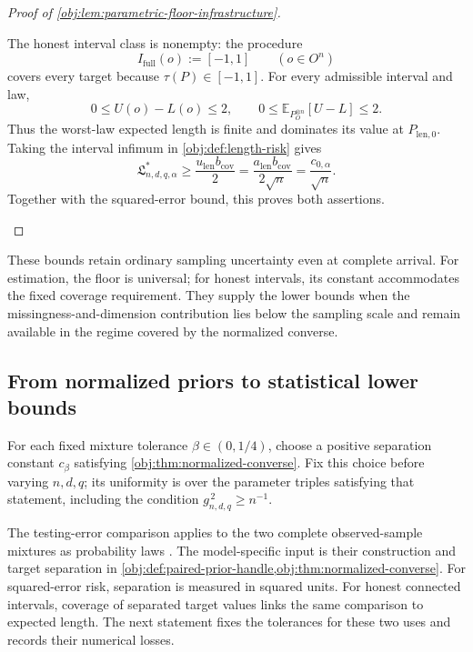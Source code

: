 \documentclass[11pt]{article}
\begin{document}
\begin{proof}[Proof of \cref{obj:lem:parametric-floor-infrastructure}]
\begin{enumerate}
The honest interval class is nonempty: the procedure
\[
I_{\mathrm{full}}(o):=[-1,1]
\qquad(o\in O^n)
\]
covers every target because \(\tau(P)\in[-1,1]\). For every admissible interval and law,
\[
0\le U(o)-L(o)\le2,
\qquad
0\le\mathbb E_{P_O^{\otimes n}}[U-L]\le2.
\]
Thus the worst-law expected length is finite and dominates its value at \(P_{\mathrm{len},0}\). Taking the interval infimum in \cref{obj:def:length-risk} gives
\[
\mathfrak L^*_{n,d,q,\alpha}
\ge
\frac{u_{\mathrm{len}}b_{\mathrm{cov}}}{2}
=
\frac{a_{\mathrm{len}}b_{\mathrm{cov}}}{2\sqrt n}
=
\frac{c_{0,\alpha}}{\sqrt n}.
\]
Together with the squared-error bound, this proves both assertions.
\end{enumerate}
\end{proof}

These bounds retain ordinary sampling uncertainty even at complete arrival. For estimation, the floor is universal; for honest intervals, its constant accommodates the fixed coverage requirement. They supply the lower bounds when the missingness-and-dimension contribution lies below the sampling scale and remain available in the regime covered by the normalized converse.

\subsection{From normalized priors to statistical lower bounds}

For each fixed mixture tolerance \(\beta\in(0,1/4)\), choose a positive separation constant \(c_\beta\) satisfying \cref{obj:thm:normalized-converse}. Fix this choice before varying \(n,d,q\); its uniformity is over the parameter triples satisfying that statement, including the condition \(g_{n,d,q}^{\,2}\ge n^{-1}\).

The testing-error comparison applies to the two complete observed-sample mixtures as probability laws \citep[Theorem~2.2]{Tsybakov2009}. The model-specific input is their construction and target separation in \cref{obj:def:paired-prior-handle,obj:thm:normalized-converse}. For squared-error risk, separation is measured in squared units. For honest connected intervals, coverage of separated target values links the same comparison to expected length. The next statement fixes the tolerances for these two uses and records their numerical losses.
\end{document}
